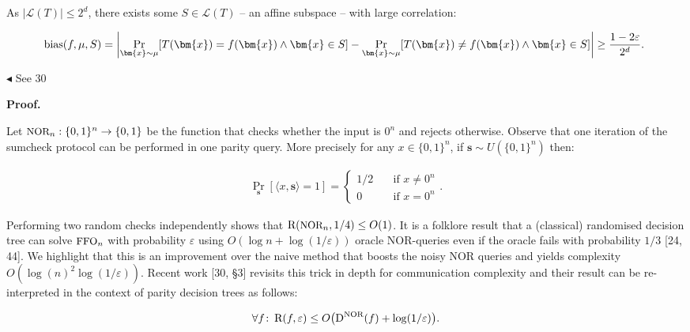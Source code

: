As $|\mathcal{L}(T)|\leq 2^{d}$, there exists some $S\in\mathcal{L}(T)$ – an affine subspace – with large correlation:\par


\[\begin{gathered}
{\textup{bias}}(f,\mu,S)=\left|\Pr_{\bm{x}\sim\mu}[T(\bm{x})=f(\bm{x})\wedge\bm{x}\in S]-\Pr_{\bm{x}\sim\mu}[T(\bm{x})\neq f(\bm{x})\wedge\bm{x}\in S]\right|\geq\frac{1-2\varepsilon}{2^{d}}.\
\end{gathered}\]


$\blacktriangleleft$
See 30\par





\par\medskip\noindent\textbf{Proof.}\par




Let ${\textrm{\small{NOR}}}_{n}:\{0,1\}^{n}\to\{0,1\}$ be the function that checks whether the input is $0^{n}$ and rejects otherwise. Observe that one iteration of the sumcheck protocol can be performed in one parity query. More precisely for any $x\in\{0,1\}^{n}$, if $\bm{s}\sim U\left(\{0,1\}^{n}\right)$ then:\par


\[\begin{gathered}
\Pr_{\bm{s}}[\langle x,\bm{s}\rangle=1]=\begin{cases}1/2&\quad\text{if $x\neq 0^{n}$}\\
0&\quad\text{if $x=0^{n}$}\end{cases}.
\end{gathered}\]


Performing two random checks independently shows that ${\textup{R}}({\textrm{\small{NOR}}}_{n},1/4)\leq O(1)$. It is a folklore result that a (classical) randomised decision tree can solve ${\textrm{\small{FFO}}}_{n}$ with probability $\varepsilon$ using $O(\log n+\log(1/\varepsilon))$ oracle NOR-queries even if the oracle fails with probability $1/3$ [24, 44]. We highlight that this is an improvement over the naive method that boosts the noisy NOR queries and yields complexity $O(\log(n)^{2}\log(1/\varepsilon))$. Recent work [30, §3] revisits this trick in depth for communication complexity and their result can be re-interpreted in the context of parity decision trees as follows:\par


\[\begin{gathered}
\forall f\colon\,{\textup{R}}(f,\varepsilon)\leq O\big{(}{\textup{D}}^{{\textrm{\small{\scriptsize NOR}}}}(f)+\log(1/\varepsilon)\big{)}.
\end{gathered}\]


